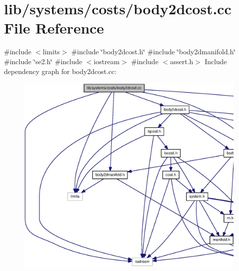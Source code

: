 \section{lib/systems/costs/body2dcost.cc \-File \-Reference}
\label{body2dcost_8cc}
{\ttfamily \#include $<$limits$>$}\*
{\ttfamily \#include \char`\"{}body2dcost.\-h\char`\"{}}\*
{\ttfamily \#include \char`\"{}body2dmanifold.\-h\char`\"{}}\*
{\ttfamily \#include \char`\"{}se2.\-h\char`\"{}}\*
{\ttfamily \#include $<$iostream$>$}\*
{\ttfamily \#include $<$assert.\-h$>$}\*
\-Include dependency graph for body2dcost.\-cc\-:
\nopagebreak
\begin{figure}[H]
\begin{center}
\leavevmode
\includegraphics[width=350pt]{body2dcost_8cc__incl}
\end{center}
\end{figure}
